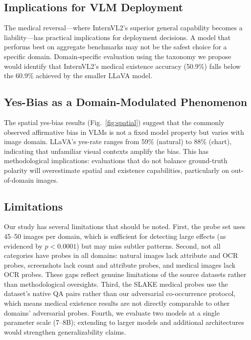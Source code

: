 \documentclass[conference]{IEEEtran}
\begin{document}
\subsection{Implications for VLM Deployment}

The medical reversal---where InternVL2's superior general capability becomes a liability---has practical implications for deployment decisions. A model that performs best on aggregate benchmarks may not be the safest choice for a specific domain. Domain-specific evaluation using the taxonomy we propose would identify that InternVL2's medical existence accuracy (50.9\%) falls below the 60.9\% achieved by the smaller LLaVA model.

\subsection{Yes-Bias as a Domain-Modulated Phenomenon}

The spatial yes-bias results (Fig.~\ref{fig:spatial}) suggest that the commonly observed affirmative bias in VLMs \cite{li2023pope} is not a fixed model property but varies with image domain. LLaVA's yes-rate ranges from 59\% (natural) to 88\% (chart), indicating that unfamiliar visual contexts amplify the bias. This has methodological implications: evaluations that do not balance ground-truth polarity will overestimate spatial and existence capabilities, particularly on out-of-domain images.

\subsection{Limitations}

Our study has several limitations that should be noted. First, the probe set uses 45--50 images per domain, which is sufficient for detecting large effects (as evidenced by $p < 0.0001$) but may miss subtler patterns. Second, not all categories have probes in all domains: natural images lack attribute and OCR probes, screenshots lack count and attribute probes, and medical images lack OCR probes. These gaps reflect genuine limitations of the source datasets rather than methodological oversights. Third, the SLAKE medical probes use the dataset's native QA pairs rather than our adversarial co-occurrence protocol, which means medical existence results are not directly comparable to other domains' adversarial probes. Fourth, we evaluate two models at a single parameter scale (7--8B); extending to larger models and additional architectures would strengthen generalizability claims.
\end{document}
